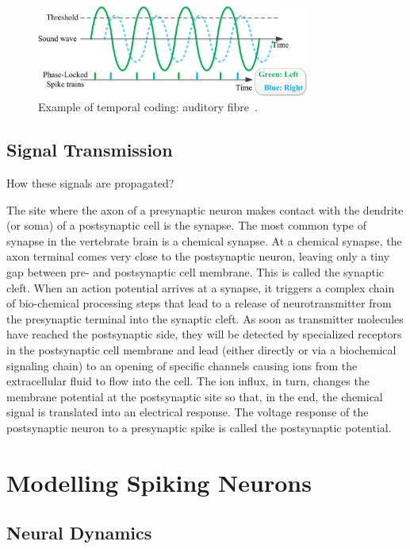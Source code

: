 \begin{figure}[bt]
	\centering
	\includegraphics[width=0.8\textwidth]{pics_snn/phaselocking.png}
	\caption{Example of temporal coding: auditory fibre~\cite{liu2013modeling}.}
	\label{Fig:audio_fibre}
\end{figure}

\subsection{Signal Transmission}
How these signals are propagated? 

The site where the axon of a presynaptic neuron makes contact with the dendrite (or soma) of a postsynaptic cell is the synapse. The most common type of synapse in the vertebrate brain is a chemical synapse. At a chemical synapse, the axon terminal comes very close to the postsynaptic neuron, leaving only a tiny gap between pre- and postsynaptic cell membrane. This is called the synaptic cleft. When an action potential arrives at a synapse, it triggers a complex chain of bio-chemical processing steps that lead to a release of neurotransmitter from the presynaptic terminal into the synaptic cleft. As soon as transmitter molecules have reached the postsynaptic side, they will be detected by specialized receptors in the postsynaptic cell membrane and lead (either directly or via a biochemical signaling chain) to an opening of specific channels causing ions from the extracellular fluid to flow into the cell. The ion influx, in turn, changes the membrane potential at the postsynaptic site so that, in the end, the chemical signal is translated into an electrical response. The voltage response of the postsynaptic neuron to a presynaptic spike is called the postsynaptic potential.




\section{Modelling Spiking Neurons}
\label{sec:spike}
\subsection{Neural Dynamics}

